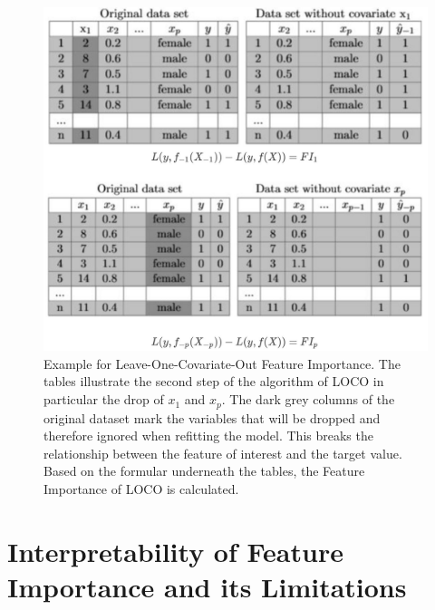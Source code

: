 \documentclass[
]{krantz}
\begin{document}
\begin{figure}

{\centering \includegraphics[width=0.65\linewidth]{images/LOCO_All} 

}

\caption{Example for Leave-One-Covariate-Out Feature Importance. The tables illustrate the second step of the algorithm of LOCO in particular the drop of $x_{1}$ and $x_{p}$. The dark grey columns of the original dataset mark the variables that will be dropped and therefore ignored when refitting the model. This breaks the relationship between the feature of interest and the target value. Based on the formular underneath the tables, the Feature Importance of LOCO is calculated.}\label{fig:LOCO}
\end{figure}

\hypertarget{interpretability-of-feature-importance-and-its-limitations}{%
\section{Interpretability of Feature Importance and its Limitations}\label{interpretability-of-feature-importance-and-its-limitations}}
\end{document}
